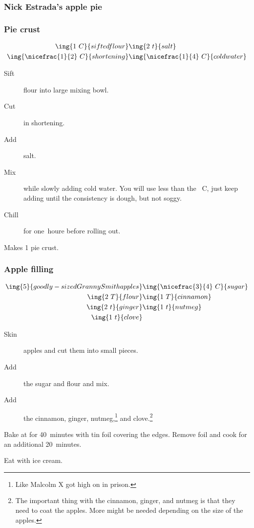 \subsubsection{Nick Estrada's apple pie}

\subsubsection{Pie crust}
\begin{align*}
    \ing{1~C}{sifted flour}             & \ing{2~t}{salt} \\
    \ing{\nicefrac{1}{2}~C}{shortening} & \ing{\nicefrac{1}{4}~C}{cold water} \\
\end{align*}

\begin{description}
    \item[Sift]flour into large mixing bowl.
    \item[Cut]in shortening.
    \item[Add]salt.
    \item[Mix]while slowly adding cold water. You will use less than the ~C, just keep adding until the consistency is dough, but not soggy.
    \item[Chill]for one~houre before rolling out.
\end{description}

Makes 1 pie crust.

\subsubsection{Apple filling}
\begin{align*}
    \ing{5}{goodly-sized Granny Smith apples} & \ing{\nicefrac{3}{4}~C}{sugar} \\
    \ing{2~T}{flour}                          & \ing{1~T}{cinnamon}            \\
    \ing{2~t}{ginger}                         & \ing{1~t}{nutmeg}              \\
    \ing{1~t}{clove}
\end{align*}

\begin{description}
    \item[Skin]apples and cut them into small pieces.
    \item[Add]the sugar and flour and mix.
    \item[Add]the cinnamon, ginger, nutmeg,\footnote{Like Malcolm X got high on in prison.} and clove.\footnote{The important thing with the cinnamon, ginger, and nutmeg is that they need to coat the apples. More might be needed depending on the size of the apples.}
\end{description}

Bake at  for 40~minutes with tin foil covering the edges. Remove foil and cook for an additional 20~minutes.

Eat with ice cream.

\pagebreak
